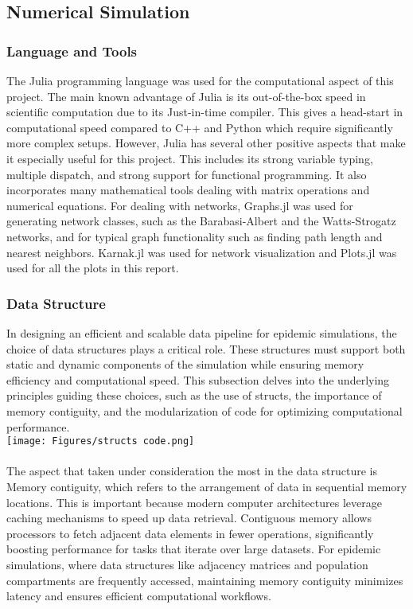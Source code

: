 \subsection{Numerical Simulation}
\subsubsection{Language and Tools}
The Julia programming language was used for the computational aspect of this project. The main known advantage of Julia is its out-of-the-box speed in scientific computation due to its  Just-in-time compiler. This gives a head-start in computational speed compared to C++ and Python which require significantly more complex setups. However, Julia has several other positive aspects that make it especially useful for this project. This includes its strong variable typing, multiple dispatch, and strong support for functional programming. It also incorporates many mathematical tools dealing with matrix operations and numerical equations. For dealing with networks, Graphs.jl was used for generating network classes, such as the Barabasi-Albert and the Watts-Strogatz networks, and for typical graph functionality such as finding path length and nearest neighbors. Karnak.jl was used for network visualization and Plots.jl was used for all the plots in this report.
\subsubsection{Data Structure}
In designing an efficient and scalable data pipeline for epidemic simulations, the choice of data structures plays a critical role. These structures must support both static and dynamic components of the simulation while ensuring memory efficiency and computational speed. This subsection delves into the underlying principles guiding these choices, such as the use of structs, the importance of memory contiguity, and the modularization of code for optimizing computational performance.\\

\texttt{[image: Figures/structs code.png]}
\\\\
The aspect that taken under consideration the most in the data structure is Memory contiguity, which refers to the arrangement of data in sequential memory locations. This is important because modern computer architectures leverage caching mechanisms to speed up data retrieval. Contiguous memory allows processors to fetch adjacent data elements in fewer operations, significantly boosting performance for tasks that iterate over large datasets. For epidemic simulations, where data structures like adjacency matrices and population compartments are frequently accessed, maintaining memory contiguity minimizes latency and ensures efficient computational workflows.\\

